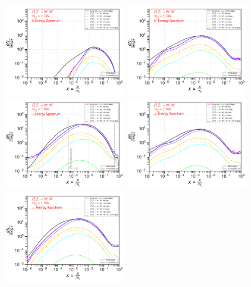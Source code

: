 \documentclass[epj,nopacs,fleqn]{svjour}
\begin{document}
\begin{figure}[!h]
	\centering
	\subfigure
	{ \includegraphics[width=0.48\textwidth]{Fig/n1ww_comparison/1000_antiprotons_n1ww_comparison.pdf} } 
	\subfigure
	{\includegraphics[width=0.48\textwidth]{Fig/n1ww_comparison/1000_positrons_n1ww_comparison.pdf} }
	\subfigure
	{\includegraphics[width=0.48\textwidth]{Fig/n1ww_comparison/1000_gammas_n1ww_comparison.pdf} }
	\subfigure
	{\includegraphics[width=0.48\textwidth]{Fig/n1ww_comparison/1000_neutrinos_e_n1ww_comparison.pdf} }
	\subfigure
	{\includegraphics[width=0.48\textwidth]{Fig/n1ww_comparison/1000_neutrinos_mu_n1ww_comparison.pdf} }

\end{figure}
\end{document}
